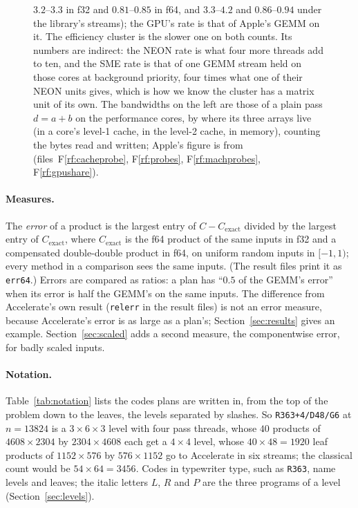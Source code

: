 \documentclass[11pt]{article}
\newcommand{\rf}[1]{F\ref{rf:#1}}
\newcommand{\lv}[1]{\texttt{#1}}
\begin{document}
\begin{figure}[!tbp]
{$3.2$--$3.3$ in f32 and $0.81$--$0.85$ in f64, and $3.3$--$4.2$ and
$0.86$--$0.94$ under the library's streams); the GPU's rate is that of Apple's GEMM on it.
The efficiency cluster is the slower one on both counts.  Its numbers are
indirect: the NEON rate is what four more threads add to ten, and the SME
rate is that of one GEMM stream held on those cores at background
priority, four times what one of their NEON units gives, which is how we know the
cluster has a matrix unit of its own.  The
bandwidths on the left are those of a plain pass $d=a+b$ on the performance
cores, by where its three arrays live (in a core's level-1 cache, in the
level-2 cache, in memory), counting the bytes read and written; Apple's
figure is from \cite{AppleM4Pro}
(files~\rf{cacheprobe}, \rf{probes}, \rf{machprobes}, \rf{gpushare}).}
\label{fig:machine}
\end{figure}

\paragraph{Measures.}
The \emph{error} of a product is the largest entry of
$C - C_{\mathrm{exact}}$ divided by the largest entry of
$C_{\mathrm{exact}}$, where $C_{\mathrm{exact}}$ is the f64 product of the
same inputs in f32 and a compensated double-double product in f64, on
uniform random inputs in $[-1,1)$; every method in a comparison sees the
same inputs.  (The result files print it as \texttt{err64}.)  Errors are
compared as ratios: a plan has ``$0.5$ of the GEMM's error'' when its error
is half the GEMM's on the same inputs.  The difference from Accelerate's own
result (\texttt{relerr} in the result files) is not an error measure, because
Accelerate's error is as large as a plan's; Section~\ref{sec:results} gives
an example.  Section~\ref{sec:scaled} adds a second measure, the
componentwise error, for badly scaled inputs.

\paragraph{Notation.}
Table~\ref{tab:notation} lists the codes plans are written in, from the top
of the problem down to the leaves, the levels separated by slashes.  So
\lv{R363+4/D48/G6} at $n=13824$ is a $3\times6\times3$ level with four pass
threads, whose $40$ products of $4608\times2304$ by $2304\times4608$ each get
a $4\times4$ level, whose $40\times48 = 1920$ leaf products of $1152\times576$
by $576\times1152$ go to Accelerate in six streams; the classical count would
be $54\times64 = 3456$.  Codes in typewriter type, such as \lv{R363}, name
levels and leaves; the italic letters $L$, $R$ and $P$ are the three
programs of a level (Section~\ref{sec:levels}).
\end{document}

